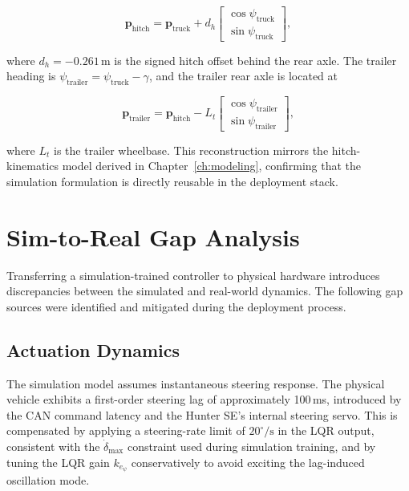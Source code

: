 \begin{equation}
    \mathbf{p}_\text{hitch} = \mathbf{p}_\text{truck} + d_h \begin{bmatrix} \cos\psi_\text{truck} \\ \sin\psi_\text{truck} \end{bmatrix},
\end{equation}

where $d_h = -0.261$\,m is the signed hitch offset behind the rear axle. The trailer heading is $\psi_\text{trailer} = \psi_\text{truck} - \gamma$, and the trailer rear axle is located at

\begin{equation}
    \mathbf{p}_\text{trailer} = \mathbf{p}_\text{hitch} - L_t \begin{bmatrix} \cos\psi_\text{trailer} \\ \sin\psi_\text{trailer} \end{bmatrix},
\end{equation}

where $L_t$ is the trailer wheelbase. This reconstruction mirrors the hitch-kinematics model derived in Chapter~\ref{ch:modeling}, confirming that the simulation formulation is directly reusable in the deployment stack.

\section{Sim-to-Real Gap Analysis}

Transferring a simulation-trained controller to physical hardware introduces discrepancies between the simulated and real-world dynamics. The following gap sources were identified and mitigated during the deployment process.

\subsection{Actuation Dynamics}

The simulation model assumes instantaneous steering response. The physical vehicle exhibits a first-order steering lag of approximately 100\,ms, introduced by the CAN command latency and the Hunter SE's internal steering servo. This is compensated by applying a steering-rate limit of $20^\circ/\text{s}$ in the LQR output, consistent with the $\dot{\delta}_\text{max}$ constraint used during simulation training, and by tuning the LQR gain $k_{e_\psi}$ conservatively to avoid exciting the lag-induced oscillation mode.

